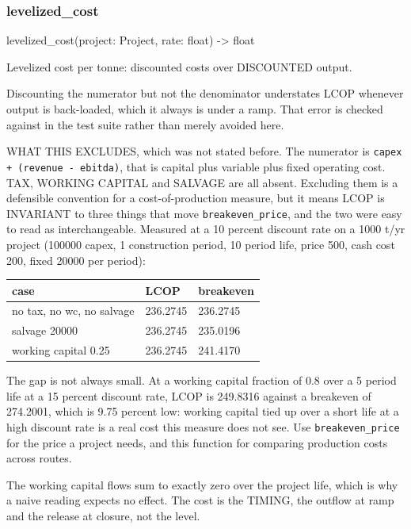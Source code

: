 \documentclass[10pt,a4paper,twoside]{report}
\begin{document}
\subsubsection*{levelized\_cost}

\begin{verbatimsmall}
levelized_cost(project: Project, rate: float) -> float
\end{verbatimsmall}

Levelized cost per tonne: discounted costs over DISCOUNTED output.

Discounting the numerator but not the denominator understates LCOP whenever output is back-loaded, which it always is under a ramp. That error is checked against in the test suite rather than merely avoided here.

WHAT THIS EXCLUDES, which was not stated before. The numerator is \texttt{capex + (revenue - ebitda)}, that is capital plus variable plus fixed operating cost. TAX, WORKING CAPITAL and SALVAGE are all absent. Excluding them is a defensible convention for a cost-of-production measure, but it means LCOP is INVARIANT to three things that move \texttt{breakeven\_price}, and the two were easy to read as interchangeable. Measured at a 10 percent discount rate on a 1000 t/yr project (100000 capex, 1 construction period, 10 period life, price 500, cash cost 200, fixed 20000 per period):

\begin{center}
\footnotesize
\begin{tabular}{@{}llp{}@{}}
\toprule
case & LCOP & breakeven \\
\midrule
no tax, no wc, no salvage & 236.2745 & 236.2745 \\
salvage 20000 & 236.2745 & 235.0196 \\
working capital 0.25 & 236.2745 & 241.4170 \\
\bottomrule
\end{tabular}
\end{center}

The gap is not always small. At a working capital fraction of 0.8 over a 5 period life at a 15 percent discount rate, LCOP is 249.8316 against a breakeven of 274.2001, which is 9.75 percent low: working capital tied up over a short life at a high discount rate is a real cost this measure does not see. Use \texttt{breakeven\_price} for the price a project needs, and this function for comparing production costs across routes.

The working capital flows sum to exactly zero over the project life, which is why a naive reading expects no effect. The cost is the TIMING, the outflow at ramp and the release at closure, not the level.
\end{document}
